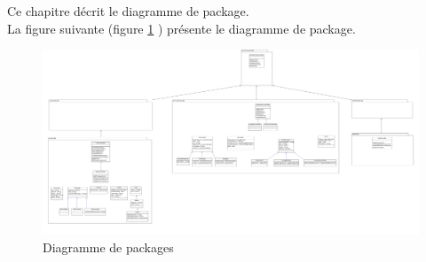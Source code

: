 
Ce chapitre décrit le diagramme de package. \\

La figure suivante (figure \ref{diagrammeDePackagePng} ) présente le diagramme de package.

\begin{figure}
	\centering
	\includegraphics[scale=0.195, angle=90]{images/diagrammePackages/diagrammePackage.png}
	\caption{Diagramme de packages}
	\label{diagrammeDePackagePng}
\end{figure}